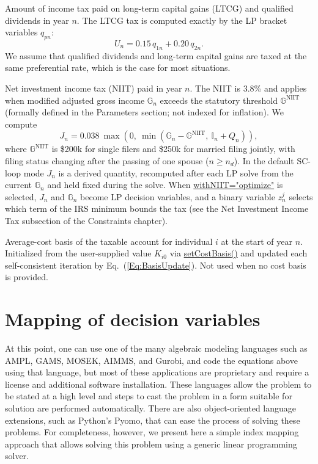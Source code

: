 \documentclass[fleqn,12pt]{report}
\newcommand{\code}[1]{\url{#1}}
\begin{document}
\begin{description}[leftmargin=4em,style=multiline]
\item [$U_n$]
	Amount of income tax paid on long-term capital gains (LTCG) and qualified dividends in year $n$.
	The LTCG tax is computed exactly by the LP bracket variables $q_{pn}$:
	\begin{equation}
		U_n = 0.15\,q_{1n} + 0.20\,q_{2n}.
	\end{equation}
	We assume that qualified dividends and long-term capital gains are taxed at the same
	preferential rate, which is the case for most situations.

\item [$J_n$]
	Net investment income tax (NIIT) paid in year $n$. The NIIT is 3.8\% and applies
	when modified adjusted gross income $\mathbb{G}_n$ exceeds the statutory threshold
	$\mathbb{G}^{\mathrm{NIIT}}$ (formally defined in the Parameters section; not indexed for inflation). We compute
	\begin{equation}
		J_n = 0.038\ \max\left(0,\ \min\left(\mathbb{G}_n - \mathbb{G}^{\mathrm{NIIT}},\ \mathbb{I}_n + Q_n\right)\right),
	\end{equation}
	where $\mathbb{G}^{\mathrm{NIIT}}$ is \$200k for single filers and \$250k for married filing jointly,
	with filing status changing after the passing of one spouse ($n \ge n_d$).
	In the default SC-loop mode $J_n$ is a derived quantity, recomputed after each
	LP solve from the current $\mathbb{G}_n$ and held fixed during the solve.
	When \code{withNIIT="optimize"} is selected, $J_n$ and $\mathbb{G}_n$ become
	LP decision variables, and a binary variable $z^j_n$ selects which term of the
	IRS minimum bounds the tax (see the Net Investment Income Tax subsection of
	the Constraints chapter).

\item [$K_{in}$]
	Average-cost basis of the taxable account for individual $i$ at the start of year $n$.
	Initialized from the user-supplied value $K_{i0}$ via \code{setCostBasis()} and
	updated each self-consistent iteration by Eq.~(\ref{Eq:BasisUpdate}).
	Not used when no cost basis is provided.

\end{description}

\chapter{Mapping of decision variables}
\label{Chap:VarMap}
At this point, one can use one of the many algebraic modeling languages
such as AMPL, GAMS, MOSEK, AIMMS, and Gurobi, and code the equations above
using that language, but most of these applications are
proprietary and require a license and additional software installation.
These languages allow the problem to be stated at a high level and
steps to cast the problem in a form suitable for solution are performed automatically.
There are also object-oriented language extensions, such as Python's Pyomo,
that can ease the process of solving these problems.
For completeness, however, we present here a simple
index mapping approach that allows solving this problem using a generic
linear programming solver.
\end{document}
